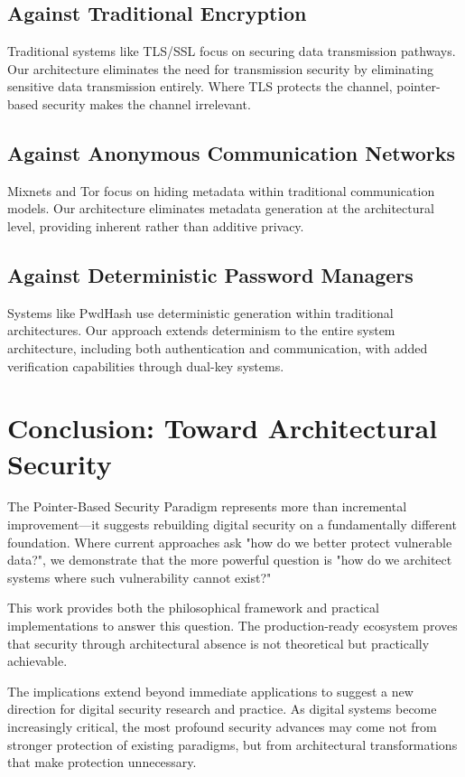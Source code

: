 \documentclass[11pt,a4paper]{article}
\begin{document}
\subsection{Against Traditional Encryption}

Traditional systems like TLS/SSL focus on securing data transmission pathways. Our architecture eliminates the need for transmission security by eliminating sensitive data transmission entirely. Where TLS protects the channel, pointer-based security makes the channel irrelevant.

\subsection{Against Anonymous Communication Networks}

Mixnets and Tor focus on hiding metadata within traditional communication models. Our architecture eliminates metadata generation at the architectural level, providing inherent rather than additive privacy.

\subsection{Against Deterministic Password Managers}

Systems like PwdHash use deterministic generation within traditional architectures. Our approach extends determinism to the entire system architecture, including both authentication and communication, with added verification capabilities through dual-key systems.

\section{Conclusion: Toward Architectural Security}

The Pointer-Based Security Paradigm represents more than incremental improvement—it suggests rebuilding digital security on a fundamentally different foundation. Where current approaches ask "how do we better protect vulnerable data?", we demonstrate that the more powerful question is "how do we architect systems where such vulnerability cannot exist?"

This work provides both the philosophical framework and practical implementations to answer this question. The production-ready ecosystem proves that security through architectural absence is not theoretical but practically achievable.

The implications extend beyond immediate applications to suggest a new direction for digital security research and practice. As digital systems become increasingly critical, the most profound security advances may come not from stronger protection of existing paradigms, but from architectural transformations that make protection unnecessary.
\end{document}
